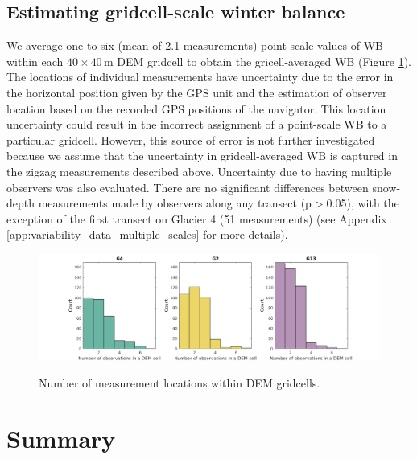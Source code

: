 \documentclass{sfuthesis}
\begin{document}
\subsection{Estimating gridcell-scale winter balance}

We average one to six (mean of 2.1 measurements) point-scale values of WB within each $40 \times 40$\,m DEM gridcell to obtain the gricell-averaged WB (Figure \ref{fig:NumObsPerCell}). The locations of individual measurements have uncertainty due to the error in the horizontal position given by the GPS unit and the estimation of observer location based on the recorded GPS positions of the navigator. This location uncertainty could result in the incorrect assignment of a point-scale WB to a particular gridcell. However, this source of error is not further investigated because we assume that the uncertainty in gridcell-averaged WB is captured in the zigzag measurements described above. Uncertainty due to having multiple observers was also evaluated. There are no significant differences between snow-depth measurements made by observers along any transect (p$>$0.05), with the exception of the first transect on Glacier 4 (51 measurements) (see Appendix \ref{app:variability_data_multiple_scales} for more details). 

\begin{figure}[H]
	\centering
	\includegraphics[width =\textwidth]{NumObsPerCell.png}\\
	\caption{Number of measurement locations within DEM gridcells.}
	\label{fig:NumObsPerCell}
\end{figure}


\section{Summary}
\end{document}
